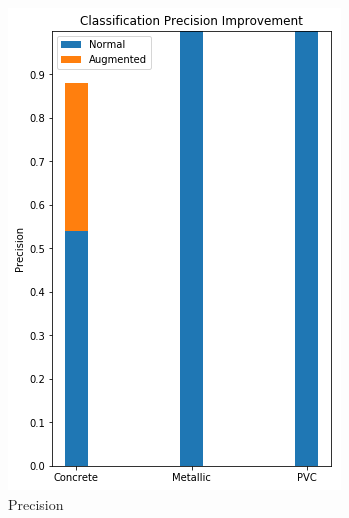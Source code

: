 \begin{figure}[H]
\begin{subfigure}[b]{0.4\linewidth}
    \includegraphics[width=\linewidth]{figures/Combined-Precision.png}
    \caption{Precision}
  \end{subfigure}
  \begin{subfigure}[b]{0.4\linewidth}

\end{subfigure}
\end{figure}
